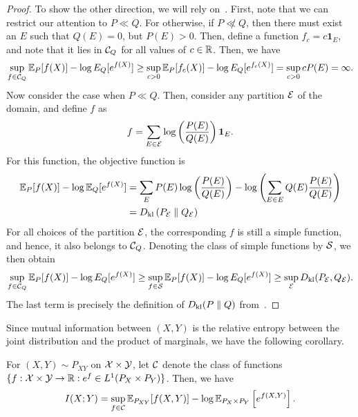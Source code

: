 \begin{proof}
                To show the other direction, we will rely on~. First, note that we can restrict our attention to $P\ll Q$. For otherwise, if $P \not \ll Q$, then there must exist an $E$ such that $Q(E)=0$, but $P(E)>0$. Then, define a function $f_c = c \boldsymbol{1}_E$, and note that it lies in $\mathcal{C}_Q$ for all values of $c \in \mathbb{R}$. Then, we have 
                \begin{align}
                    \sup_{f \in \mathcal{C}_Q} \mathbb{E}_P[f(X)] - \log E_Q[e^{f(X)}] \geq \sup_{c > 0}  \mathbb{E}_P[f_c(X)] - \log E_Q[e^{f_c(X)}] = \sup_{c >0} c P(E) = \infty.
                \end{align}
                Now consider the case when $P \ll Q$. Then, consider any partition $\mathcal{E}$ of the domain, and define $f$ as 
                \begin{align}
                    f = \sum_{E \in \mathcal{E}} \log \left( \frac{P(E)}{Q(E)} \right) \boldsymbol{1}_E. 
                \end{align}
                For this function, the objective function is 
                \begin{align}
                    \mathbb{E}_P[f(X)] - \log \mathbb{E}_Q[e^{f(X)}] &= \sum_{E}P(E) \log \left( \frac{P(E)}{Q(E)} \right) - \log \left( \sum_{E\in E} Q(E) \frac{P(E)}{Q(E)} \right) \\
                    & = D_{\text{kl}} \left( P_{\mathcal{E}} \parallel Q_{\mathcal{E}} \right) 
                \end{align}
                For all choices of the partition $\mathcal{E}$, the corresponding $f$ is still a simple function, and hence, it also belongs to $\mathcal{C}_Q$. Denoting the class of simple functions by $\mathcal{S}$, we then obtain 
                \begin{align}
                    \sup_{f \in \mathcal{C}_Q} \mathbb{E}_P[f(X)] - \log E_Q[e^{f(X)}] \geq 
                    \sup_{f \in \mathcal{S}} \mathbb{E}_P[f(X)] - \log E_Q[e^{f(X)}]  \geq \sup_{\mathcal{E}} D_{\text{kl}}(P_{\mathcal{E}}, Q_{\mathcal{E}}). 
                \end{align}
                The last term is precisely the definition of $D_{\text{kl}}(P\parallel Q)$ from~. 
            \end{proof}

            Since mutual information between $(X,Y)$ is the relative entropy between the joint distribution and the product of marginals, we have the following corollary. 
            \begin{corollary}
                \label{corollary:mi-donsker-varadhan} 
                For $(X, Y) \sim P_{XY}$ on $\mathcal{X} \times \mathcal{Y}$, let $\mathcal{C}$ denote the class of functions $\{f: \mathcal{X} \times \mathcal{Y} \to \mathbb{R}: e^f \in L^1(P_X \times P_Y) \}$. Then, we have 
                \begin{align}
                    I(X;Y) = \sup_{f \in \mathcal{C}} \mathbb{E}_{P_{XY}}[f(X, Y)] - \log \mathbb{E}_{P_X \times P_Y} \left[ e^{f(X, Y)} \right]. 
                \end{align}
            \end{corollary}

